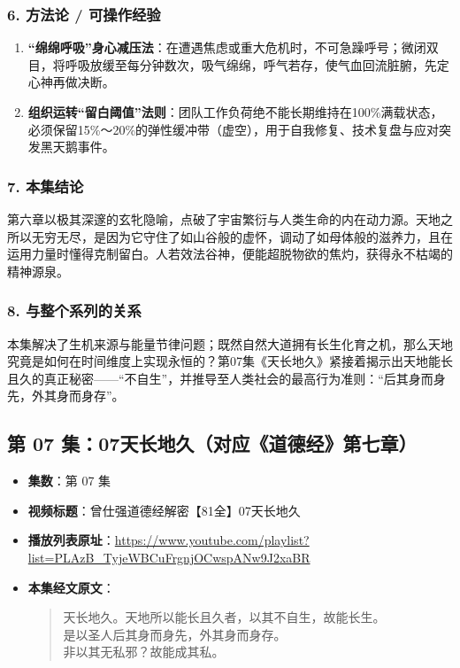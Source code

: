\subsubsection{6. 方法论 / 可操作经验}
\begin{enumerate}
    \item \textbf{“绵绵呼吸”身心减压法}：在遭遇焦虑或重大危机时，不可急躁呼号；微闭双目，将呼吸放缓至每分钟数次，吸气绵绵，呼气若存，使气血回流脏腑，先定心神再做决断。
    \item \textbf{组织运转“留白阈值”法则}：团队工作负荷绝不能长期维持在100\%满载状态，必须保留15\%～20\%的弹性缓冲带（虚空），用于自我修复、技术复盘与应对突发黑天鹅事件。
\end{enumerate}

\subsubsection{7. 本集结论}
第六章以极其深邃的玄牝隐喻，点破了宇宙繁衍与人类生命的内在动力源。天地之所以无穷无尽，是因为它守住了如山谷般的虚怀，调动了如母体般的滋养力，且在运用力量时懂得克制留白。人若效法谷神，便能超脱物欲的焦灼，获得永不枯竭的精神源泉。

\subsubsection{8. 与整个系列的关系}
本集解决了生机来源与能量节律问题；既然自然大道拥有长生化育之机，那么天地究竟是如何在时间维度上实现永恒的？第07集《天长地久》紧接着揭示出天地能长且久的真正秘密——“不自生”，并推导至人类社会的最高行为准则：“后其身而身先，外其身而身存”。

\clearpage

\subsection{第 07 集：07天长地久（对应《道德经》第七章）}
\label{sec:ep07}

\begin{itemize}
    \item \textbf{集数}：第 07 集
    \item \textbf{视频标题}：曾仕强道德经解密【81全】07天长地久
    \item \textbf{播放列表原址}：\url{https://www.youtube.com/playlist?list=PLAzB_TyjeWBCuFrgnjOCwspANw9J2xaBR}
    \item \textbf{本集经文原文}：
    \begin{quote}\kaishu
    天长地久。天地所以能长且久者，以其不自生，故能长生。\\
    是以圣人后其身而身先，外其身而身存。\\
    非以其无私邪？故能成其私。
    \end{quote}
\end{itemize}

